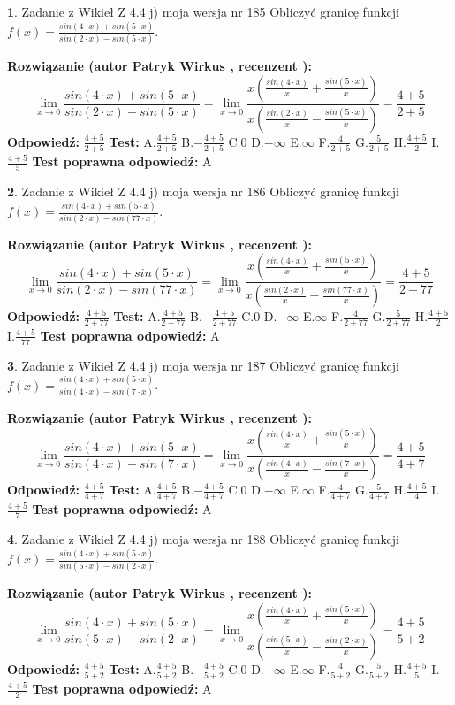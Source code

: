 \documentclass[12pt, a4paper]{article}
\theoremstyle{definition} %
\newtheorem{zad}{}
\newcommand{\zadStart}[1]{\begin{zad}#1\newline}
\newcommand{\zadStop}{\end{zad}}
\newcommand{\rozwStart}[2]{\noindent \textbf{Rozwiązanie (autor #1 , recenzent #2): }\newline}
\newcommand{\rozwStop}{\newline}
\newcommand{\odpStart}{\noindent \textbf{Odpowiedź:}\newline}
\newcommand{\odpStop}{\newline}
\newcommand{\testStart}{\noindent \textbf{Test:}\newline}
\newcommand{\testStop}{\newline}
\newcommand{\kluczStart}{\noindent \textbf{Test poprawna odpowiedź:}\newline}
\newcommand{\kluczStop}{\newline}
\begin{document}
\zadStart{Zadanie z Wikieł Z 4.4 j) moja wersja nr 185}
Obliczyć granicę funkcji $f(x)=\frac{sin(4\cdot x) +sin(5\cdot x)}{sin(2\cdot x) -sin(5\cdot x)}$.
\zadStop
\rozwStart{Patryk Wirkus}{}
$$\lim\limits_{x\to 0}\frac{sin(4\cdot x) +sin(5\cdot x)}{sin(2\cdot x) -sin(5\cdot x)}=\lim\limits_{x\to 0}\frac{x(\frac{sin(4\cdot x)}{x}+\frac{sin(5\cdot x)}{x})}{x(\frac{sin(2\cdot x)}{x}-\frac{sin(5\cdot x)}{x})}=\frac{4+5}{2+5}$$
\rozwStop
\odpStart
$\frac{4+5}{2+5}$
\odpStop
\testStart
A.$\frac{4+5}{2+5}$
B.$-\frac{4+5}{2+5}$
C.$0$
D.$-\infty$
E.$\infty$
F.$\frac{4}{2+5}$
G.$\frac{5}{2+5}$
H.$\frac{4+5}{2}$
I.$\frac{4+5}{5}$
\testStop
\kluczStart
A
\kluczStop



\zadStart{Zadanie z Wikieł Z 4.4 j) moja wersja nr 186}
Obliczyć granicę funkcji $f(x)=\frac{sin(4\cdot x) +sin(5\cdot x)}{sin(2\cdot x) -sin(77\cdot x)}$.
\zadStop
\rozwStart{Patryk Wirkus}{}
$$\lim\limits_{x\to 0}\frac{sin(4\cdot x) +sin(5\cdot x)}{sin(2\cdot x) -sin(77\cdot x)}=\lim\limits_{x\to 0}\frac{x(\frac{sin(4\cdot x)}{x}+\frac{sin(5\cdot x)}{x})}{x(\frac{sin(2\cdot x)}{x}-\frac{sin(77\cdot x)}{x})}=\frac{4+5}{2+77}$$
\rozwStop
\odpStart
$\frac{4+5}{2+77}$
\odpStop
\testStart
A.$\frac{4+5}{2+77}$
B.$-\frac{4+5}{2+77}$
C.$0$
D.$-\infty$
E.$\infty$
F.$\frac{4}{2+77}$
G.$\frac{5}{2+77}$
H.$\frac{4+5}{2}$
I.$\frac{4+5}{77}$
\testStop
\kluczStart
A
\kluczStop



\zadStart{Zadanie z Wikieł Z 4.4 j) moja wersja nr 187}
Obliczyć granicę funkcji $f(x)=\frac{sin(4\cdot x) +sin(5\cdot x)}{sin(4\cdot x) -sin(7\cdot x)}$.
\zadStop
\rozwStart{Patryk Wirkus}{}
$$\lim\limits_{x\to 0}\frac{sin(4\cdot x) +sin(5\cdot x)}{sin(4\cdot x) -sin(7\cdot x)}=\lim\limits_{x\to 0}\frac{x(\frac{sin(4\cdot x)}{x}+\frac{sin(5\cdot x)}{x})}{x(\frac{sin(4\cdot x)}{x}-\frac{sin(7\cdot x)}{x})}=\frac{4+5}{4+7}$$
\rozwStop
\odpStart
$\frac{4+5}{4+7}$
\odpStop
\testStart
A.$\frac{4+5}{4+7}$
B.$-\frac{4+5}{4+7}$
C.$0$
D.$-\infty$
E.$\infty$
F.$\frac{4}{4+7}$
G.$\frac{5}{4+7}$
H.$\frac{4+5}{4}$
I.$\frac{4+5}{7}$
\testStop
\kluczStart
A
\kluczStop



\zadStart{Zadanie z Wikieł Z 4.4 j) moja wersja nr 188}
Obliczyć granicę funkcji $f(x)=\frac{sin(4\cdot x) +sin(5\cdot x)}{sin(5\cdot x) -sin(2\cdot x)}$.
\zadStop
\rozwStart{Patryk Wirkus}{}
$$\lim\limits_{x\to 0}\frac{sin(4\cdot x) +sin(5\cdot x)}{sin(5\cdot x) -sin(2\cdot x)}=\lim\limits_{x\to 0}\frac{x(\frac{sin(4\cdot x)}{x}+\frac{sin(5\cdot x)}{x})}{x(\frac{sin(5\cdot x)}{x}-\frac{sin(2\cdot x)}{x})}=\frac{4+5}{5+2}$$
\rozwStop
\odpStart
$\frac{4+5}{5+2}$
\odpStop
\testStart
A.$\frac{4+5}{5+2}$
B.$-\frac{4+5}{5+2}$
C.$0$
D.$-\infty$
E.$\infty$
F.$\frac{4}{5+2}$
G.$\frac{5}{5+2}$
H.$\frac{4+5}{5}$
I.$\frac{4+5}{2}$
\testStop
\kluczStart
A
\kluczStop
\end{document}
